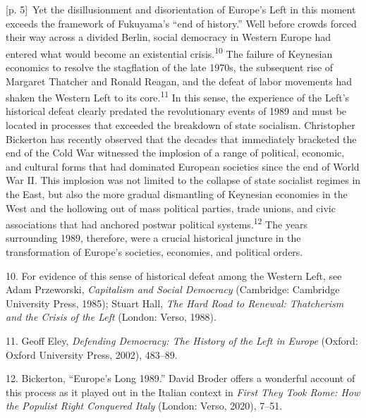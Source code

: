 \documentclass[10pt,a4paper]{article}
\begin{document}
{\scriptsize\color{gray} [p. 5]}\ Yet the disillusionment and disorientation of Europe’s Left in this moment exceeds the framework of Fukuyama’s “end of history.” Well before crowds forced their way across a divided Berlin, social democracy in Western Europe had entered what would become an existential crisis.\nobreak\textsuperscript{10} The failure of Keynesian economics to resolve the stagflation of the late 1970s, the subsequent rise of Margaret Thatcher and Ronald Reagan, and the defeat of labor movements had shaken the Western Left to its core.\nobreak\textsuperscript{11} In this sense, the experience of the Left’s historical defeat clearly predated the revolutionary events of 1989 and must be located in processes that exceeded the breakdown of state socialism. Christopher Bickerton has recently observed that the decades that immediately bracketed the end of the Cold War witnessed the implosion of a range of political, economic, and cultural forms that had dominated European societies since the end of World War II. This implosion was not limited to the collapse of state socialist regimes in the East, but also the more gradual dismantling of Keynesian economies in the West and the hollowing out of mass political parties, trade unions, and civic associations that had anchored postwar political systems.\nobreak\textsuperscript{12} The years surrounding 1989, therefore, were a crucial historical juncture in the transformation of Europe’s societies, economies, and political orders.\par{\small 10. For evidence of this sense of historical defeat among the Western Left, see Adam Przeworski, \textit{Capitalism and Social Democracy} (Cambridge: Cambridge University Press, 1985); Stuart Hall, \textit{The Hard Road to Renewal: Thatcherism and the Crisis of the Left} (London: Verso, 1988).\par}{\small 11. Geoff Eley, \textit{Defending Democracy: The History of the Left in Europe} (Oxford: Oxford University Press, 2002), 483–89.\par}{\small 12. Bickerton, “Europe’s Long 1989.” David Broder offers a wonderful account of this process as it played out in the Italian context in \textit{First They Took Rome: How the Populist Right Conquered Italy} (London: Verso, 2020), 7–51.\par}
\end{document}
